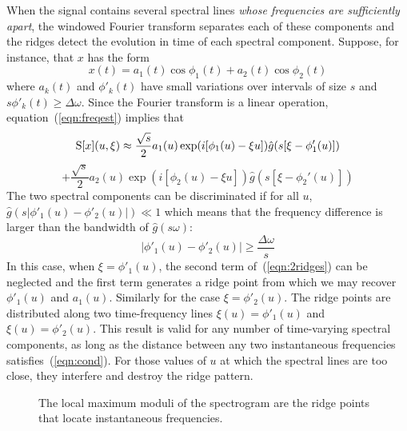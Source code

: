 When the signal contains several spectral lines \emph{whose
frequencies are sufficiently apart}, the windowed Fourier transform
separates each of these components and the ridges detect the evolution
in time of each spectral component.  Suppose, for instance, that $x$
has the form 
\[
x(t) = a_1(t)\cos\phi_1(t) + a_2(t)\cos\phi_2(t)
\]
where $a_k(t)$ and $\phi'_k(t)$ have small variations over intervals
of size $s$ and $s\phi'_k(t)\geq\Delta\omega$.  Since the Fourier
transform is a linear operation, equation~(\ref{eqn:freqest}) implies
that 
\begin{equation}
\label{eqn:2ridges}
\S[x](u,\xi)\approx\frac{\sqrt{s}}{2}
a_1(u)\exp(i[\phi_1(u)-\xi u])\hat{g}(s[\xi-\phi_1'(u)])%
\end{equation}
\[+\frac{\sqrt{s}}{2}
a_2(u)\exp(i[\phi_2(u)-\xi u])\hat{g}(s[\xi-\phi_2'(u)])\]
The two spectral components can be discriminated if for all $u$,
$\hat{g}(s|\phi'_1(u)-\phi'_2(u)|) \ll 1$
which means that the frequency difference is larger than the bandwidth
of $\hat{g}(s\omega)$:
\begin{equation}
\label{eqn:cond}
|\phi'_1(u)-\phi'_2(u)|\geq \frac{\Delta \omega}{s}
\end{equation}
In this case, when $\xi = \phi'_1(u)$, the second term
of~(\ref{eqn:2ridges}) can be neglected and the first term generates a
ridge point from which we may recover $\phi'_1(u)$ and $a_1(u)$.
Similarly for the case $\xi = \phi'_2(u)$.  The ridge points are
distributed along two time-frequency lines $\xi(u)=\phi'_1(u)$ and 
$\xi(u)=\phi'_2(u)$.  This result is valid for any number of
time-varying spectral components, as long as the distance between any
two instantaneous frequencies satisfies~(\ref{eqn:cond}).  For those
values of $u$ at which the spectral lines are too close, they
interfere and destroy the ridge pattern.

\begin{center}
\begin{figure}
\caption{The local maximum moduli of the spectrogram are the ridge
points that locate instantaneous frequencies.}
\label{fig:ridges}
\end{figure}
\end{center}

